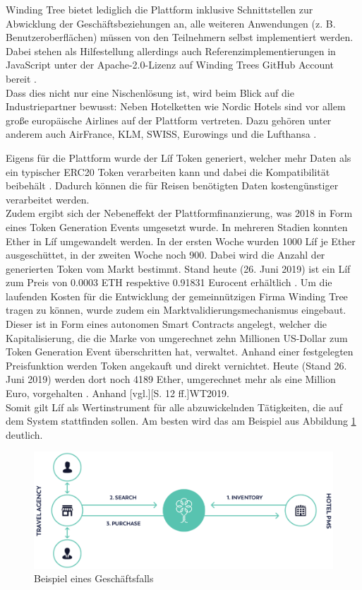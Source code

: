 Winding Tree bietet lediglich die Plattform inklusive Schnittstellen zur Abwicklung der Geschäftsbeziehungen an, alle weiteren Anwendungen (z. B. Benutzeroberflächen) müssen von den Teilnehmern selbst implementiert werden. Dabei stehen als Hilfestellung allerdings auch Referenzimplementierungen in JavaScript unter der Apache-2.0-Lizenz auf Winding Trees GitHub Account bereit \cite{WTGitHub2019}.\\
Dass dies nicht nur eine Nischenlösung ist, wird beim Blick auf die Industriepartner bewusst: Neben Hotelketten wie Nordic Hotels sind vor allem große europäische Airlines auf der Plattform vertreten. Dazu gehören unter anderem auch AirFrance, KLM, SWISS, Eurowings und die Lufthansa \cite{WTWebsite2019}.

Eigens für die Plattform wurde der Líf Token generiert, welcher mehr Daten als ein typischer ERC20 Token verarbeiten kann und dabei die Kompatibilität beibehält \cite[][S. 9]{WT2019}. Dadurch können die für Reisen benötigten Daten kostengünstiger verarbeitet werden.\\ 
Zudem ergibt sich der Nebeneffekt der Plattformfinanzierung, was 2018 in Form eines Token Generation Events umgesetzt wurde. In mehreren Stadien konnten Ether in Líf umgewandelt werden. In der ersten Woche wurden 1000 Líf je Ether ausgeschüttet, in der zweiten Woche noch 900. Dabei wird die Anzahl der generierten Token vom Markt bestimmt. Stand heute (26. Juni 2019) ist ein Líf zum Preis von 0.0003 ETH respektive 0.91831 Eurocent erhältlich \cite{Coinmarketcap2019}. Um die laufenden Kosten für die Entwicklung der gemeinnützigen Firma Winding Tree tragen zu können, wurde zudem ein Marktvalidierungsmechanismus eingebaut. Dieser ist in Form eines autonomen Smart Contracts angelegt, welcher die Kapitalisierung, die die Marke von umgerechnet zehn Millionen US-Dollar zum Token Generation Event überschritten hat, verwaltet. Anhand einer festgelegten Preisfunktion werden Token angekauft und direkt vernichtet. Heute (Stand 26. Juni 2019) werden dort noch 4189 Ether, umgerechnet mehr als eine Million Euro, vorgehalten \cite{Lif2019}. Anhand [vgl.][S. 12 ff.]{WT2019}. \\
Somit gilt Líf als Wertinstrument für alle abzuwickelnden Tätigkeiten, die auf dem System stattfinden sollen. Am besten wird das am Beispiel aus Abbildung \ref{fig:windingTreeExample} deutlich.\\

\begin{figure}[h!]
  \centering
  \includegraphics[width=\textwidth]{Bilder/WindingTreeExample.png}
  \caption[Beispiel eines Geschäftsfalls]{Beispiel eines Geschäftsfalls \cite[S. 10]{WT2019}}
  \label{fig:windingTreeExample}
\end{figure}

